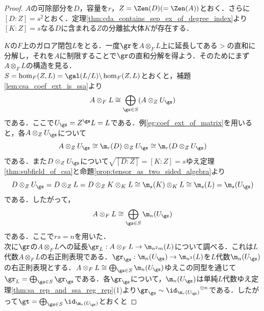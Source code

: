 \documentclass[a4paper,11pt]{jsarticle}
\begin{document}
\begin{proof}
  $A$の可除部分を$D$，容量を$r$，$Z=\Zen(D)(=\Zen(A))$とおく．さらに$[D:Z]=s^2$とおく．定理\ref{thm:cda_contains_sep_ex_of_degree_index}より$[K:Z]=s$なる$D$に含まれる$Z$の分離拡大体$K$が存在する．
  \begin{center}
  \end{center}
  $K$の$F$上のガロア閉包$L$をとる．一度$\gr$を$A\otimes_F L$上に延長してある$\gt$の直和に分解し，それを$A$に制限することで$\gr$の直和分解を得よう．そのためにまず$A\otimes_F L$の構造を見る．\\
  $S=\hom_F(Z,L)=\gal(L/L)\backslash \hom_F(Z,L)$とおくと，補題\ref{lem:csa_coef_ext_is_ssa}より
  \[
    A\otimes_F L\cong \bigoplus_{\gs\in S}(A\otimes_Z U_{\gs})
  \]
  である．ここで$U_\gs = Z^\gs L = L$である．例\ref{eg:coef_ext_of_matrix}を用いると，各$A\otimes_Z U_{\gs}$について
  \[
    A\otimes_Z U_{\gs} \cong \m_r(D)\otimes_Z U_{\gs}\cong \m_r(D\otimes_Z U_{\gs})
  \]
  である．また$D\otimes_Z U_{\gs}$について$\sqrt{[D:Z]}=[K:Z]=s$ゆえ定理\ref{thm:subfield_of_csa}と命題\ref{prop:tensor_as_two_sided_algebra}より
  \[
    D\otimes_Z U_\gs = D\otimes_Z L = D\otimes_Z K\otimes_K L \cong \m_s(K)\otimes_K L \cong \m_s(L) = \m_s(U_{\gs})
  \]
  である．したがって，
  \begin{equation}
    A\otimes_F L \cong \bigoplus_{\gs\in S} \m_{n}(U_{\gs})\label{eq:sep_sa_coef_ext_is_a_direct_sum_of_matrix_algebras}
  \end{equation}
  である．ここで$rs=n$を用いた．\\
  次に$\gr$の$A\otimes_F L$への延長$\gr_L:A\otimes_F L\to\m_{n^2m}(L)$について調べる．これは$L$代数$A\otimes_F L$の右正則表現である．$\gr_\gs:\m_n(U_\gs)\to\m_{n^2}(L)$を$L$代数$\m_n(U_\gs)$の右正則表現とする．$A\otimes_F L\cong\bigoplus_{\gs\in S} \m_{n}(U_{\gs})$ゆえこの同型を通じて$\gr_L=\bigoplus_{\gs\in S}\gr_\gs$である．各$\gr_\gs$について，$\m_n(U_\gs)$は単純$L$代数ゆえ定理\ref{thm:sa_rep_and_ssa_reg_rep}(1)より$\gr_\gs\sim {\id_{\m_r(U_\gs)}}^{\oplus n}$である．したがって$\gt=\bigoplus_{\gs\in S}\id_{\m_r(U_\gs)}$とおくと

\end{proof}
\end{document}
